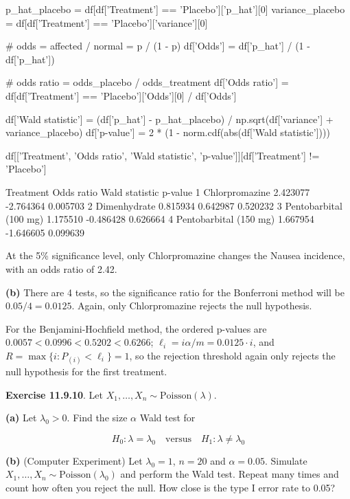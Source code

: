 \begin{python}
p_hat_placebo = df[df['Treatment'] == 'Placebo']['p_hat'][0]
variance_placebo = df[df['Treatment'] == 'Placebo']['variance'][0]

# odds = affected / normal = p / (1 - p)
df['Odds'] = df['p_hat'] / (1 - df['p_hat'])

# odds ratio = odds_placebo / odds_treatment
df['Odds ratio'] = df[df['Treatment'] == 'Placebo']['Odds'][0] / df['Odds']

df['Wald statistic'] = (df['p_hat'] - p_hat_placebo) / np.sqrt(df['variance'] + variance_placebo)
df['p-value'] = 2 * (1 - norm.cdf(abs(df['Wald statistic'])))
\end{python}

\begin{python}
df[['Treatment', 'Odds ratio', 'Wald statistic', 'p-value']][df['Treatment'] != 'Placebo']
\end{python}

\begin{console}
                Treatment  Odds ratio  Wald statistic   p-value
1          Chlorpromazine    2.423077       -2.764364  0.005703
2            Dimenhydrate    0.815934        0.642987  0.520232
3  Pentobarbital (100 mg)    1.175510       -0.486428  0.626664
4  Pentobarbital (150 mg)    1.667954       -1.646605  0.099639
\end{console}
        
    At the 5\% significance level, only Chlorpromazine changes the Nausea
incidence, with an odds ratio of 2.42.

\textbf{(b)} There are 4 tests, so the significance ratio for the
Bonferroni method will be \(0.05 / 4 = 0.0125\). Again, only
Chlorpromazine rejects the null hypothesis.

For the Benjamini-Hochfield method, the ordered p-values are
\(0.0057 < 0.0996 < 0.5202 < 0.6266\);
\(\ell_{i} = i \alpha / m = 0.0125 \cdot i\), and
\(R = \max \{ i : P_{(i)} < \ell_{i} \} = 1\), so the rejection threshold
again only rejects the null hypothesis for the first treatment.

\textbf{Exercise 11.9.10}. Let
\(X_{1}, \dots, X_{n} \sim \text{Poisson}(\lambda)\).

\textbf{(a)} Let \(\lambda_{0} > 0\). Find the size \(\alpha\) Wald test
for

\[ H_{0}: \lambda = \lambda_{0} \quad \text{versus} \quad H_{1}: \lambda \neq \lambda_{0}\]

\textbf{(b)} (Computer Experiment) Let \(\lambda_{0} = 1\), \(n = 20\) and
\(\alpha = 0.05\). Simulate
\(X_{1}, \dots, X_{n} \sim \text{Poisson}(\lambda_{0})\) and perform the Wald
test. Repeat many times and count how often you reject the null. How
close is the type I error rate to 0.05?

